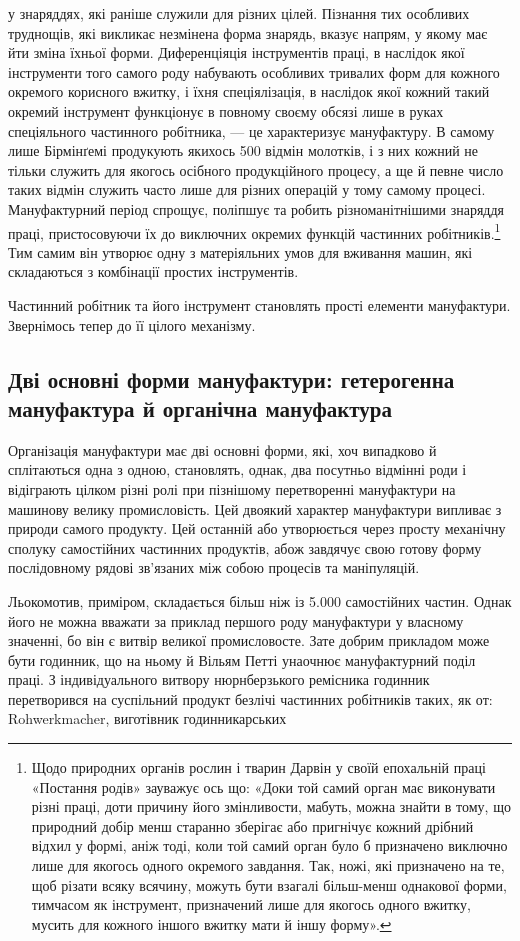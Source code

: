 \parcont{}  %
у знаряддях, які раніше служили для різних цілей. Пізнання
тих особливих труднощів, які викликає незмінена форма знарядь,
вказує напрям, у якому має йти зміна їхньої форми. Диференціяція
інструментів праці, в наслідок якої інструменти того самого роду
набувають особливих тривалих форм для кожного окремого
корисного вжитку, і їхня спеціялізація, в наслідок якої кожний
такий окремий інструмент функціонує в повному своєму обсязі
лише в руках спеціяльного частинного робітника, — це характеризує мануфактуру.
В самому лише Бірмінґемі продукують
якихось 500 відмін молотків, і з них кожний не тільки служить
для якогось осібного продукційного процесу, а ще й певне число
таких відмін служить часто лише для різних операцій у тому
самому процесі. Мануфактурний період спрощує, поліпшує та
робить різноманітнішими знаряддя праці, пристосовуючи їх до
виключних окремих функцій частинних робітників.\footnote{
Щодо природних органів рослин і тварин Дарвін у своїй епохальній праці
«Постання родів» зауважує ось що: «Доки той самий орган має виконувати різні
праці, доти причину його змінливости, мабуть, можна знайти в тому, що природний
добір менш старанно зберігає або пригнічує кожний дрібний відхил у
формі, аніж тоді, коли той самий орган було б призначено виключно лише для
якогось одного окремого завдання. Так, ножі, які призначено на те, щоб різати
всяку всячину, можуть бути взагалі більш-менш однакової форми, тимчасом як
інструмент, призначений лише для якогось одного вжитку, мусить для кожного
іншого вжитку мати й іншу форму».
} Тим самим він утворює одну з матеріяльних умов для вживання машин,
які складаються з комбінації простих інструментів.

Частинний робітник та його інструмент становлять прості
елементи мануфактури. Звернімось тепер до її цілого механізму.

\subsection{Дві основні форми мануфактури: гетерогенна мануфактура
й органічна мануфактура}

Організація мануфактури має дві основні форми, які, хоч
випадково й сплітаються одна з одною, становлять, однак, два
посутньо відмінні роди і відіграють цілком різні ролі при пізнішому перетворенні
мануфактури на машинову велику промисловість. Цей двоякий характер мануфактури
випливає з природи самого продукту. Цей останній або утворюється через просту
механічну сполуку самостійних частинних продуктів, абож
завдячує свою готову форму послідовному рядові зв’язаних між
собою процесів та маніпуляцій.

Льокомотив, приміром, складається більш ніж із \num{5.000} самостійних частин. Однак
його не можна вважати за приклад першого роду мануфактури у власному значенні,
бо він є витвір великої промисловосте. Зате добрим прикладом може бути годинник,
що на ньому й Вільям Петті унаочнює мануфактурний поділ праці. З індивідуального
витвору нюрнберзького ремісника годинник перетворився на суспільний продукт
безлічі частинних робітників
таких, як от: Rohwerkmacher, виготівник годинникарських
\parbreak{}  %
